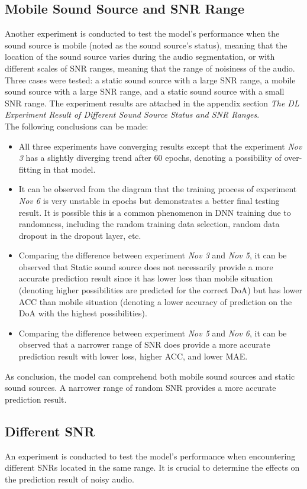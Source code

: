 \subsection*{Mobile Sound Source and SNR Range}
Another experiment is conducted to test the model's performance when the sound source is mobile (noted as the sound source's status), meaning that the location of the sound source varies during the audio segmentation, or with different scales of SNR ranges, meaning that the range of noisiness of the audio. \\
Three cases were tested: a static sound source with a large SNR range, a mobile sound source with a large SNR range, and a static sound source with a small SNR range. The experiment results are attached in the appendix section \textit{The DL Experiment Result of Different Sound Source Status and SNR Ranges}. \\
The following conclusions can be made:
\begin{itemize}
    \item All three experiments have converging results except that the experiment \textit{Nov 3} has a slightly diverging trend after \(60\) epochs, denoting a possibility of over-fitting in that model. 
    \item It can be observed from the diagram that the training process of experiment \textit{Nov 6} is very unstable in epochs but demonstrates a better final testing result. It is possible this is a common phenomenon in DNN training due to randomness, including the random training data selection, random data dropout in the dropout layer, etc. 
    \item Comparing the difference between experiment \textit{Nov 3} and \textit{Nov 5}, it can be observed that Static sound source does not necessarily provide a more accurate prediction result since it has lower loss than mobile situation (denoting higher possibilities are predicted for the correct DoA) but has lower ACC than mobile situation (denoting a lower accuracy of prediction on the DoA with the highest possibilities).
    \item Comparing the difference between experiment \textit{Nov 5} and \textit{Nov 6}, it can be observed that a narrower range of SNR does provide a more accurate prediction result with lower loss, higher ACC, and lower MAE.
\end{itemize}
As conclusion, the model can comprehend both mobile sound sources and static sound sources. A narrower range of random SNR provides a more accurate prediction result.

\subsection*{Different SNR}
An experiment is conducted to test the model's performance when encountering different SNRs located in the same range. It is crucial to determine the effects on the prediction result of noisy audio.

